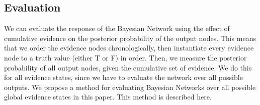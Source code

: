 \documentclass[12pt]{article}
\begin{document}
\subsection{Evaluation}

We can evaluate the response of the Bayesian Network using the effect of cumulative evidence on the posterior probability of the output nodes. This means that we order the evidence nodes chronologically, then instantiate every evidence node to a truth value (either T or F) in order. Then, we measure the posterior probability of all output nodes, given the cumulative set of evidence. We do this for all evidence states, since we have to evaluate the network over all possible outputs. We propose a method for evaluating Bayesian Networks over all possible global evidence states in this paper. This method is described here.
\end{document}
